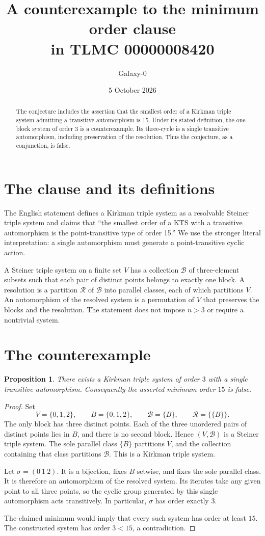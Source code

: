 \documentclass[11pt]{article}
\title{A counterexample to the minimum order clause\protect\\in TLMC 00000008420}
\author{Galaxy-0}
\date{5 October 2026}
\newtheorem{proposition}{Proposition}
\begin{document}
\maketitle
\begin{abstract}
The conjecture includes the assertion that the smallest order of a Kirkman
triple system admitting a transitive automorphism is $15$. Under its stated
definition, the one-block system of order $3$ is a counterexample. Its
three-cycle is a single transitive automorphism, including preservation of
the resolution. Thus the conjecture, as a conjunction, is false.
\end{abstract}

\section{The clause and its definitions}
The English statement defines a Kirkman triple system as a resolvable
Steiner triple system and claims that ``the smallest order of a KTS with a
transitive automorphism is the point-transitive type of order 15.''
We use the stronger literal interpretation: a single automorphism must
generate a point-transitive cyclic action.

A Steiner triple system on a finite set $V$ has a collection $\mathcal B$
of three-element subsets such that each pair of distinct points belongs
to exactly one block. A resolution is a partition $\mathcal R$ of
$\mathcal B$ into parallel classes, each of which partitions $V$.
An automorphism of the resolved system is a permutation of $V$ that
preserves the blocks and the resolution. The statement does not impose
$n>3$ or require a nontrivial system.

\section{The counterexample}
\begin{proposition}
There exists a Kirkman triple system of order $3$ with a single transitive
automorphism. Consequently the asserted minimum order $15$ is false.
\end{proposition}
\begin{proof}
Set
\[
 V=\{0,1,2\},\qquad B=\{0,1,2\},\qquad
 \mathcal B=\{B\},\qquad \mathcal R=\{\{B\}\}.
\]
The only block has three distinct points. Each of the three unordered
pairs of distinct points lies in $B$, and there is no second block.
Hence $(V,\mathcal B)$ is a Steiner triple system. The sole parallel
class $\{B\}$ partitions $V$, and the collection containing that class
partitions $\mathcal B$. This is a Kirkman triple system.

Let $\sigma=(0\ 1\ 2)$. It is a bijection, fixes $B$ setwise, and fixes
the sole parallel class. It is therefore an automorphism of the resolved
system. Its iterates take any given point to all three points, so the
cyclic group generated by this single automorphism acts transitively.
In particular, $\sigma$ has order exactly $3$.

The claimed minimum would imply that every such system has order at
least $15$. The constructed system has order $3<15$, a contradiction.
\end{proof}
\end{document}
